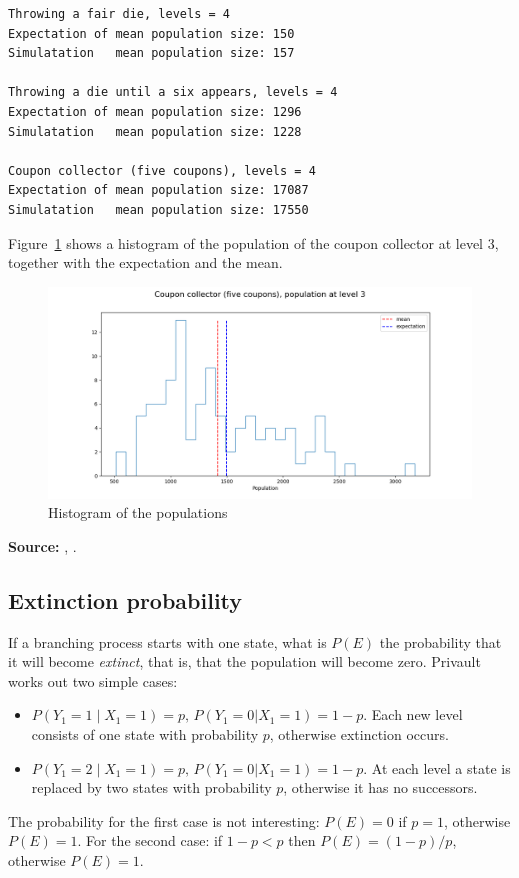 \documentclass[11pt,a4paper]{article}
\begin{document}
\begin{verbatim}
Throwing a fair die, levels = 4
Expectation of mean population size: 150
Simulatation   mean population size: 157

Throwing a die until a six appears, levels = 4
Expectation of mean population size: 1296
Simulatation   mean population size: 1228

Coupon collector (five coupons), levels = 4
Expectation of mean population size: 17087
Simulatation   mean population size: 17550
\end{verbatim}

Figure~\ref{f.population-01} shows a histogram of the population of the coupon collector at level 3, together with the expectation and the mean.

\begin{figure}
\begin{center}
\includegraphics[width=\textwidth]{population-01}
\caption{Histogram of the populations}\label{f.population-01}
\end{center}
\end{figure}

\textbf{Source:} \cite[Section 8.2]{privault}, \cite[Problems~4, 14]{mosteller,mos}.


\subsection{Extinction probability}

If a branching process starts with one state, what is $P(E)$ the probability that it will become \emph{extinct}, that is, that the population will become zero. Privault \cite[Section 8.3]{privault} works out two simple cases:
\begin{itemize}
\item $P(Y_1=1 \mid X_1=1)=p,\, P(Y_1=0 | X_1=1)=1-p$. Each new level consists of one state with probability $p$, otherwise extinction occurs.
\item $P(Y_1=2 \mid X_1=1)=p,\, P(Y_1=0 | X_1=1)=1-p$. At each level a state is replaced by two states with probability $p$, otherwise it has no successors.
\end{itemize}
The probability for the first case is not interesting: $P(E)=0$ if $p=1$, otherwise $P(E)=1$. For the second case: if $1-p<p$ then $P(E)=(1-p)/p$, otherwise $P(E)=1$.
\end{document}
